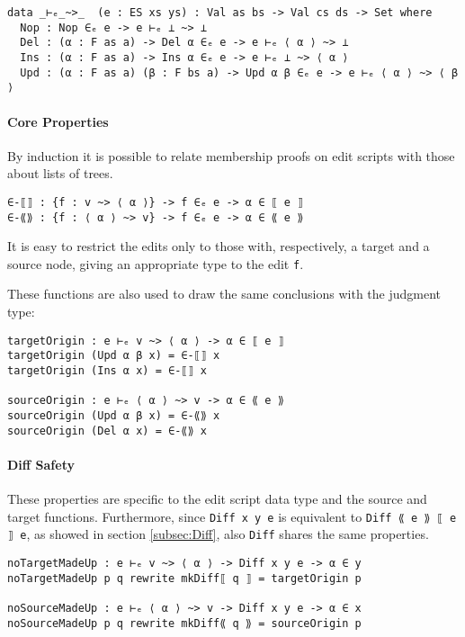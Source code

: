 \documentclass[../Thesis.tex]{subfiles}
\begin{document}
\begin{verbatim}
data _⊢ₑ_~>_  (e : ES xs ys) : Val as bs -> Val cs ds -> Set where
  Nop : Nop ∈ₑ e -> e ⊢ₑ ⊥ ~> ⊥
  Del : (α : F as a) -> Del α ∈ₑ e -> e ⊢ₑ ⟨ α ⟩ ~> ⊥
  Ins : (α : F as a) -> Ins α ∈ₑ e -> e ⊢ₑ ⊥ ~> ⟨ α ⟩
  Upd : (α : F as a) (β : F bs a) -> Upd α β ∈ₑ e -> e ⊢ₑ ⟨ α ⟩ ~> ⟨ β ⟩ 
\end{verbatim}

	
	
	\paragraph{Core Properties}
	By induction it is possible to relate membership proofs on edit scripts
	with those about lists of trees.
	
\begin{verbatim}
∈-⟦⟧ : {f : v ~> ⟨ α ⟩} -> f ∈ₑ e -> α ∈ ⟦ e ⟧ 
∈-⟪⟫ : {f : ⟨ α ⟩ ~> v} -> f ∈ₑ e -> α ∈ ⟪ e ⟫
\end{verbatim}

	It is easy to restrict the edits only to those with, respectively, a target and
	a source node, giving an appropriate type to the edit \texttt{f}.

	These functions are also used to draw the same conclusions with the 
	judgment type:
\begin{verbatim}
targetOrigin : e ⊢ₑ v ~> ⟨ α ⟩ -> α ∈ ⟦ e ⟧
targetOrigin (Upd α β x) = ∈-⟦⟧ x
targetOrigin (Ins α x) = ∈-⟦⟧ x

sourceOrigin : e ⊢ₑ ⟨ α ⟩ ~> v -> α ∈ ⟪ e ⟫
sourceOrigin (Upd α β x) = ∈-⟪⟫ x
sourceOrigin (Del α x) = ∈-⟪⟫ x
\end{verbatim}

	\paragraph{Diff Safety}
	These properties are specific to the edit script data type and the source and 
	target functions.
	Furthermore, since \texttt{Diff x y e} is equivalent
	to \texttt{Diff ⟪ e ⟫ ⟦ e ⟧ e}, as showed in section \ref{subsec:Diff},
	also \texttt{Diff} shares the same properties.
	
\begin{verbatim}
noTargetMadeUp : e ⊢ₑ v ~> ⟨ α ⟩ -> Diff x y e -> α ∈ y 
noTargetMadeUp p q rewrite mkDiff⟦ q ⟧ = targetOrigin p

noSourceMadeUp : e ⊢ₑ ⟨ α ⟩ ~> v -> Diff x y e -> α ∈ x 
noSourceMadeUp p q rewrite mkDiff⟪ q ⟫ = sourceOrigin p
\end{verbatim}
\end{document}
